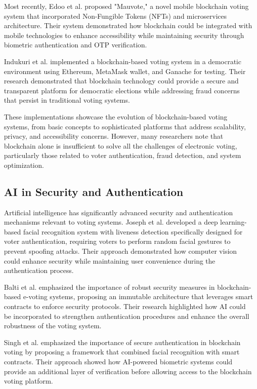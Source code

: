 \documentclass[conference]{IEEEtran}
\begin{document}
Most recently, Edoo et al. \cite{b7} proposed "Mauvote," a novel mobile blockchain voting system that incorporated Non-Fungible Tokens (NFTs) and microservices architecture. Their system demonstrated how blockchain could be integrated with mobile technologies to enhance accessibility while maintaining security through biometric authentication and OTP verification.

Indukuri et al. \cite{b8} implemented a blockchain-based voting system in a democratic environment using Ethereum, MetaMask wallet, and Ganache for testing. Their research demonstrated that blockchain technology could provide a secure and transparent platform for democratic elections while addressing fraud concerns that persist in traditional voting systems.

These implementations showcase the evolution of blockchain-based voting systems, from basic concepts to sophisticated platforms that address scalability, privacy, and accessibility concerns. However, many researchers note that blockchain alone is insufficient to solve all the challenges of electronic voting, particularly those related to voter authentication, fraud detection, and system optimization.

\subsection{AI in Security and Authentication}
Artificial intelligence has significantly advanced security and authentication mechanisms relevant to voting systems. Joseph et al. \cite{b6} developed a deep learning-based facial recognition system with liveness detection specifically designed for voter authentication, requiring voters to perform random facial gestures to prevent spoofing attacks. Their approach demonstrated how computer vision could enhance security while maintaining user convenience during the authentication process.

Balti et al. \cite{b2} emphasized the importance of robust security measures in blockchain-based e-voting systems, proposing an immutable architecture that leverages smart contracts to enforce security protocols. Their research highlighted how AI could be incorporated to strengthen authentication procedures and enhance the overall robustness of the voting system.

Singh et al. \cite{b5} emphasized the importance of secure authentication in blockchain voting by proposing a framework that combined facial recognition with smart contracts. Their approach showed how AI-powered biometric systems could provide an additional layer of verification before allowing access to the blockchain voting platform.
\end{document}
